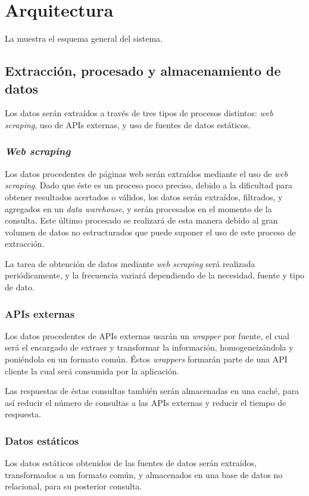 \section{Arquitectura}

La  muestra el esquema general del sistema.



\subsection{Extracción, procesado y almacenamiento de datos}
Los datos serán extraídos a través de tres tipos de procesos distintos: \textit{web scraping}, uso de APIs externas, y uso de fuentes de datos estáticos.

\subsubsection*{\textit{Web scraping}}
Los datos procedentes de páginas web serán extraídos mediante el uso de \textit{web scraping}. Dado que éste es un proceso poco preciso, debido a la dificultad para obtener resultados acertados o válidos, los datos serán extraídos, filtrados, y agregados en un \textit{data warehouse}, y serán procesados en el momento de la consulta. Este último procesado se realizará de esta manera debido al gran volumen de datos no estructurados que puede suponer el uso de este proceso de extracción.

La tarea de obtención de datos mediante \textit{web scraping} será realizada periódicamente, y la frecuencia variará dependiendo de la necesidad, fuente y tipo de dato.


\subsubsection*{APIs externas}
Los datos procedentes de APIs externas usarán un \textit{wrapper} por fuente, el cual será el encargado de extraer y transformar la información, homogeneizándola y poniéndola en un formato común.
Éstos \textit{wrappers} formarán parte de una API cliente la cual será consumida por la aplicación. 

Las respuestas de éstas consultas también serán almacenadas en una caché, para así reducir el número de consultas a las APIs externas y reducir el tiempo de respuesta.


\subsubsection*{Datos estáticos}
Los datos estáticos obtenidos de las fuentes de datos serán extraídos, transformados a un formato común, y almacenados en una base de datos no relacional, para su posterior consulta. 

